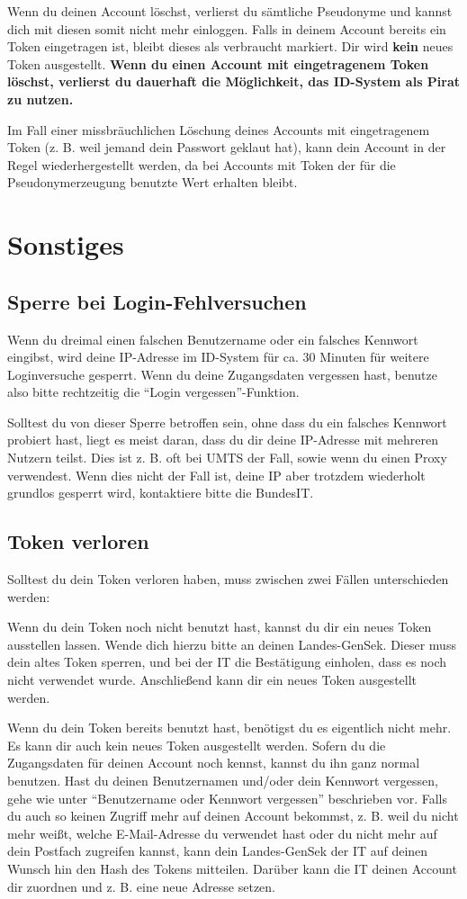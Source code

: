 Wenn du deinen Account löschst, verlierst du sämtliche Pseudonyme und kannst dich mit diesen somit nicht mehr einloggen.
Falls in deinem Account bereits ein Token eingetragen ist, bleibt dieses als verbraucht markiert.
Dir wird \textbf{kein} neues Token ausgestellt.
\textbf{Wenn du einen Account mit eingetragenem Token löschst, verlierst du dauerhaft die Möglichkeit, das ID-System als Pirat zu nutzen.}

Im Fall einer missbräuchlichen Löschung deines Accounts mit eingetragenem Token (z. B. weil jemand dein Passwort geklaut hat),
kann dein Account in der Regel wiederhergestellt werden, da bei Accounts mit Token der für die Pseudonymerzeugung benutzte Wert erhalten bleibt.

\newpage
\section{Sonstiges}
\subsection{Sperre bei Login-Fehlversuchen}
Wenn du dreimal einen falschen Benutzername oder ein falsches Kennwort eingibst,
wird deine IP-Adresse im ID-System für ca. 30 Minuten für weitere Loginversuche gesperrt.
Wenn du deine Zugangsdaten vergessen hast, benutze also bitte rechtzeitig die "`Login vergessen"'-Funktion.

Solltest du von dieser Sperre betroffen sein, ohne dass du ein falsches Kennwort probiert hast,
liegt es meist daran, dass du dir deine IP-Adresse mit mehreren Nutzern teilst.
Dies ist z. B. oft bei UMTS der Fall, sowie wenn du einen Proxy verwendest.
Wenn dies nicht der Fall ist, deine IP aber trotzdem wiederholt grundlos gesperrt wird,
kontaktiere bitte die BundesIT.

\subsection{Token verloren}
Solltest du dein Token verloren haben, muss zwischen zwei Fällen unterschieden werden:

Wenn du dein Token noch nicht benutzt hast, kannst du dir ein neues Token ausstellen lassen.
Wende dich hierzu bitte an deinen Landes-GenSek. Dieser muss dein altes Token sperren,
und bei der IT die Bestätigung einholen, dass es noch nicht verwendet wurde.
Anschließend kann dir ein neues Token ausgestellt werden.

Wenn du dein Token bereits benutzt hast, benötigst du es eigentlich nicht mehr.
Es kann dir auch kein neues Token ausgestellt werden.
Sofern du die Zugangsdaten für deinen Account noch kennst, kannst du ihn ganz normal benutzen.
Hast du deinen Benutzernamen und/oder dein Kennwort vergessen, gehe wie unter "`Benutzername oder Kennwort vergessen"' beschrieben vor.
Falls du auch so keinen Zugriff mehr auf deinen Account bekommst,
z. B. weil du nicht mehr weißt, welche E-Mail-Adresse du verwendet hast oder du nicht mehr auf dein Postfach zugreifen kannst,
kann dein Landes-GenSek der IT auf deinen Wunsch hin den Hash des Tokens mitteilen.
Darüber kann die IT deinen Account dir zuordnen und z. B. eine neue Adresse setzen.

